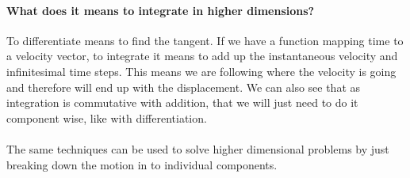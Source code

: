 \documentclass[a4paper,12pt]{article}
\begin{document}
\paragraph*{What does it means to integrate in higher dimensions?} To differentiate means to find the tangent. If we have a function mapping time to a velocity vector, to integrate it means to add up the instantaneous velocity and infinitesimal time steps. This means we are following where the velocity is going and therefore will end up with the displacement. We can also see that as integration is commutative with addition, that we will just need to do it component wise, like with differentiation. \\\\

The same techniques can be used to solve higher dimensional problems by just breaking down the motion in to individual components. 
\end{document}
